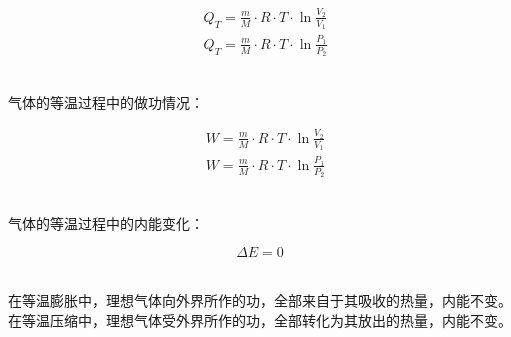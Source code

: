 \documentclass[UTF8]{ctexart}
\begin{document}
    \begin{large}
        \begin{align*}
            &Q_T=\frac{m}{M}\cdot R\cdot T\cdot\ln{\frac{V_2}{V_1}}\\[2mm]
            &Q_T=\frac{m}{M}\cdot R\cdot T\cdot\ln{\frac{P_1}{P_2}}
        \end{align*}
    \end{large}\\
    气体的等温过程中的做功情况：
    \begin{large}
        \begin{align*}
            &W=\frac{m}{M}\cdot R\cdot T\cdot\ln{\frac{V_2}{V_1}}\\[2mm]
            &W=\frac{m}{M}\cdot R\cdot T\cdot\ln{\frac{P_1}{P_2}}
        \end{align*}
    \end{large}\\
    气体的等温过程中的内能变化：
    \begin{large}
        \begin{equation*}
            \Delta E=0
        \end{equation*}
    \end{large}\\
    在等温膨胀中，理想气体向外界所作的功，全部来自于其吸收的热量，内能不变。\\[3mm]
    在等温压缩中，理想气体受外界所作的功，全部转化为其放出的热量，内能不变。

\newpage
\end{document}

